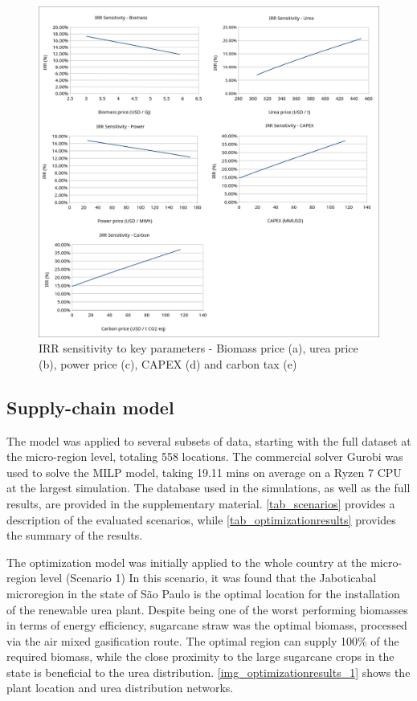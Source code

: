 \documentclass[a4paper, titlepage]{article}
\begin{document}
\begin{figure}[htb]
    \includegraphics[width=\textwidth]{img/img_IRRsens.png}
    \caption{IRR sensitivity to key parameters - Biomass price (a), urea price (b), power price (c), CAPEX (d) and
        carbon tax (e)}
    \label{img_IRRsens}
\end{figure}

\subsection{Supply-chain model}

The model was applied to several subsets of data, starting with the full dataset at the micro-region level, totaling 558
locations. The commercial solver Gurobi was used to solve the MILP model, taking 19.11 mins on average on a Ryzen 7 CPU
at the largest simulation. The database used in the simulations, as well as the full results, are provided in the
supplementary material. \autoref{tab_scenarios} provides a description of the evaluated scenarios, while
\autoref{tab_optimizationresults} provides the summary of the results.

The optimization model was initially applied to the whole country at the micro-region level (Scenario 1) In this
scenario, it was found that the Jaboticabal microregion in the state of São Paulo is the optimal location for the
installation of the renewable urea plant. Despite being one of the worst performing biomasses in terms of energy
efficiency, sugarcane straw was the optimal biomass, processed via the air mixed gasification route. The optimal region
can supply 100\% of the required biomass, while the close proximity to the large sugarcane crops in the state is
beneficial to the urea distribution. \autoref{img_optimizationresults_1} shows the plant location and urea distribution
networks.
\end{document}
